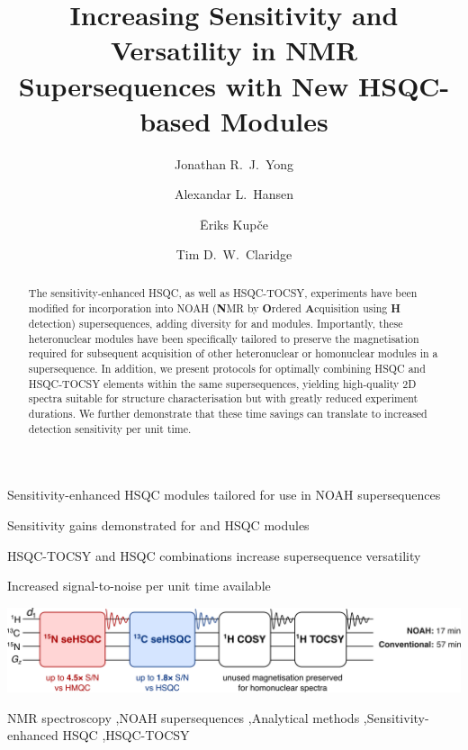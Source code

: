 \documentclass[final,twocolumn]{elsarticle}
\newcommand*{\carbon}{\ce{^{13}C}}
\newcommand*{\nitrogen}{\ce{^{15}N}}
\begin{document}
    \begin{frontmatter}
        \title{Increasing Sensitivity and Versatility in NMR Supersequences with New HSQC-based Modules}

        \address[oxford]{Chemistry Research Laboratory, Department of Chemistry, University of Oxford, Mansfield Road, Oxford, OX1 3TA, U.K.}
        \address[ohio]{Campus Chemical Instrument Center, The Ohio State University, 460 W.\ 12th Avenue, Columbus, OH, 43210 U.S.}
        \address[bruker]{Bruker UK Ltd., Banner Lane, Coventry, CV4 9GH, U.K.}

        \author[oxford]{Jonathan R.\ J.\ Yong}
        \author[ohio]{Alexandar L.\ Hansen}
        \author[bruker]{{\=E}riks Kup{\v{c}}e}
        \author[oxford]{Tim D.\ W.\ Claridge}
        \begin{abstract}
            The sensitivity-enhanced HSQC, as well as HSQC-TOCSY, experiments have been modified for incorporation into NOAH (\textbf{N}MR by \textbf{O}rdered \textbf{A}cquisition using \textbf{H} detection) supersequences, adding diversity for \carbon{} and \nitrogen{} modules.
            Importantly, these heteronuclear modules have been specifically tailored to preserve the magnetisation required for subsequent acquisition of other heteronuclear or homonuclear modules in a supersequence.
            In addition, we present protocols for optimally combining HSQC and HSQC-TOCSY elements within the same supersequences, yielding high-quality 2D spectra suitable for structure characterisation but with greatly reduced experiment durations.
            We further demonstrate that these time savings can translate to increased detection sensitivity per unit time.
        \end{abstract}
        \begin{highlights}
            \item Sensitivity-enhanced HSQC modules tailored for use in NOAH supersequences
            \item Sensitivity gains demonstrated for \carbon{} and \nitrogen{} HSQC modules
            \item HSQC-TOCSY and HSQC combinations increase supersequence versatility
            \item Increased signal-to-noise per unit time available
        \end{highlights}
        \begin{graphicalabstract}
            \includegraphics{TOC.png}
        \end{graphicalabstract}
        \begin{keyword}
            NMR spectroscopy \sep NOAH supersequences \sep Analytical methods \sep Sensitivity-enhanced HSQC \sep HSQC-TOCSY
        \end{keyword}
    \end{frontmatter}
\end{document}
